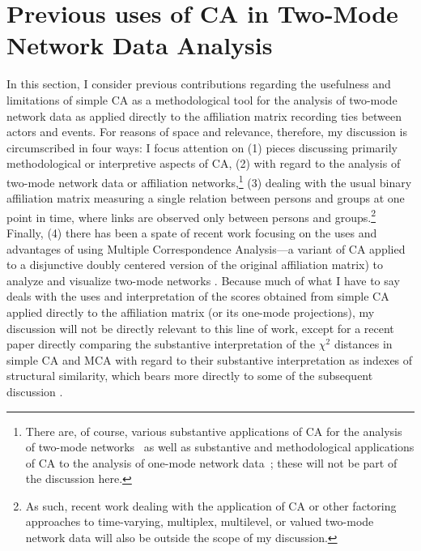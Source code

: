 \documentclass[a4paper,fleqn]{cas-sc}
\begin{document}
\section{Previous uses of CA in Two-Mode Network Data Analysis}

In this section, I consider previous contributions regarding the usefulness and limitations of simple CA as a methodological tool for the analysis of two-mode network data as applied directly to the affiliation matrix recording ties between actors and events. For reasons of space and relevance, therefore, my discussion is circumscribed in four ways: I focus attention on (1) pieces discussing primarily methodological or interpretive aspects of CA, (2) with regard to the analysis of two-mode network data or affiliation networks,\footnote{There are, of course, various substantive applications of CA for the analysis of two-mode networks~\citep[e.g.,][]{breiger2000tool, faust2002scaling, schweizer1991power, serino2024mapping, ragozini2018analysis} as well as substantive and methodological applications of CA to the analysis of one-mode network data~\citep[e.g.,][]{noma1985scaling, kumbasar1994systematic, lizardo2020correspondence}; these will not be part of the discussion here.} (3)  dealing with the usual binary affiliation matrix measuring a single relation between persons and groups at one point in time, where links are observed only between persons and groups.\footnote{As such, recent work dealing with the application of CA or other factoring approaches to time-varying, multiplex, multilevel, or valued two-mode network data \citep{ragozini2014correspondence, ragozini2015multiple, zhu2016correspondence} will also be outside the scope of my discussion.} Finally, (4) there has been a spate of recent work focusing on the uses and advantages of using Multiple Correspondence Analysis---a variant of CA applied to a disjunctive doubly centered version of the original affiliation matrix) to analyze and visualize two-mode networks \citep[e.g.,][]{dramalidis2016subset, desposito2014use, ragozini2014correspondence}. Because much of what I have to say deals with the uses and interpretation of the scores obtained from simple CA applied directly to the affiliation matrix (or its one-mode projections), my discussion will not be directly relevant to this line of work, except for a recent paper directly comparing the substantive interpretation of the $\chi^2$ distances in simple CA and MCA with regard to their substantive interpretation as indexes of structural similarity, which bears more directly to some of the subsequent discussion \citep{desposito2014comparison}.
\end{document}
